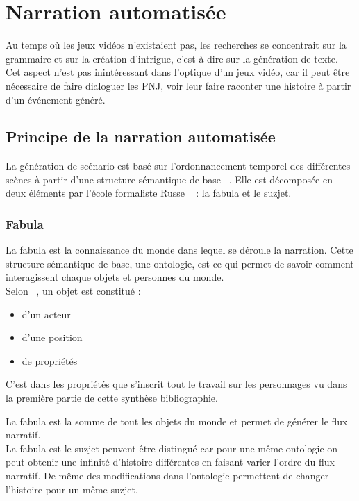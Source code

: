 \documentclass[asi]{picINSA}
\begin{document}
\chapter{Narration automatisée}

Au temps où les jeux vidéos n'existaient pas, les recherches se concentrait sur la grammaire et sur la création d'intrigue, c'est à dire sur la génération de texte. Cet aspect n'est pas inintéressant dans l'optique d'un jeux vidéo, car il peut être nécessaire de faire dialoguer les PNJ, voir leur faire raconter une histoire à partir d'un événement généré.


\section{Principe de la narration automatisée}

La génération de scénario est basé sur l'ordonnancement temporel des différentes scènes à partir d'une structure sémantique de base ~\cite{cavazza2002character}. Elle est décomposée en deux éléments par l'école formaliste Russe ~\cite{Callaway2002213} : la fabula et le suzjet. \\

\subsection{Fabula}

La fabula est la connaissance du monde dans lequel se déroule la narration. Cette structure sémantique de base, une ontologie, est ce qui permet de savoir comment interagissent chaque objets et personnes du monde. \\

Selon ~\cite{callaway2002narrative}, un objet est constitué :
\begin{itemize}
\item d'un acteur
\item d'une position
\item de propriétés \\
\end{itemize}

C'est dans les propriétés que s'inscrit tout le travail sur les personnages vu dans la première partie de cette synthèse bibliographie.

La fabula est la somme de tout les objets du monde et permet de générer le flux narratif. \\

La fabula est le suzjet peuvent être distingué car pour une même ontologie on peut obtenir une infinité d'histoire différentes en faisant varier l'ordre du flux narratif. De même des modifications dans l'ontologie permettent de changer l'histoire pour un même suzjet.
\end{document}
